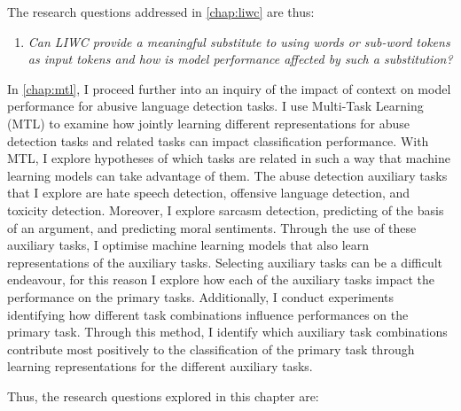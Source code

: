 {The research questions addressed in \cref{chap:liwc} are thus:

\begin{center}
\begin{minipage}{0.9\textwidth}
\vspace{5mm}
    \begin{enumerate}[start=2, label={\textbf{RQ \arabic*}}]
        \item{\textit{Can LIWC provide a meaningful substitute to using words or sub-word tokens as input tokens and how is model performance affected by such a substitution?}}
    \end{enumerate}
    \vspace{5mm}
\end{minipage}
\end{center}

In \cref{chap:mtl}, I proceed further into an inquiry of the impact of context on model performance for abusive language detection tasks.
I use Multi-Task Learning (MTL) to examine how jointly learning different representations for abuse detection tasks and related tasks can impact classification performance.
With MTL, I explore hypotheses of which tasks are related in such a way that machine learning models can take advantage of them.
The abuse detection auxiliary tasks that I explore are hate speech detection, offensive language detection, and toxicity detection.
Moreover, I explore sarcasm detection, predicting of the basis of an argument, and predicting moral sentiments.
Through the use of these auxiliary tasks, I optimise machine learning models that also learn representations of the auxiliary tasks.
Selecting auxiliary tasks can be a difficult endeavour, for this reason I explore how each of the auxiliary tasks impact the performance on the primary tasks.
Additionally, I conduct experiments identifying how different task combinations influence performances on the primary task.
Through this method, I identify which auxiliary task combinations contribute most positively to the classification of the primary task through learning representations for the different auxiliary tasks.

Thus, the research questions explored in this chapter are:

}
